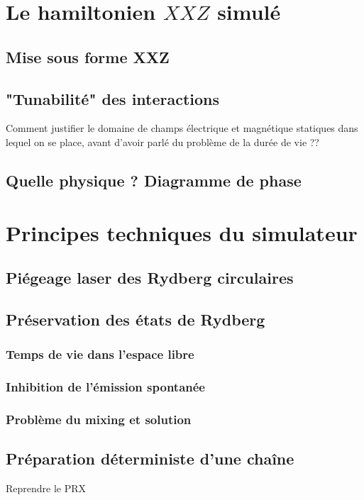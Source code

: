 \section{Le hamiltonien $XXZ$ simulé}
	\subsection{Mise sous forme XXZ}
	\subsection{"Tunabilité" des interactions}\label{subsec:tunability}
		Comment justifier le domaine de champs électrique et magnétique statiques dans lequel on se place, avant d'avoir parlé du problème de la durée de vie ??
	\subsection{Quelle physique ? Diagramme de phase}

\section{Principes techniques du simulateur}
	\subsection{Piégeage laser des Rydberg circulaires}
	\subsection{Préservation des états de Rydberg}\label{subsec:inhibition}
		\subsubsection*{Temps de vie dans l'espace libre}
		\subsubsection*{Inhibition de l'émission spontanée}
		\subsubsection*{Problème du mixing et solution}
	\subsection{Préparation déterministe d'une chaîne}

\newpage
Reprendre le PRX